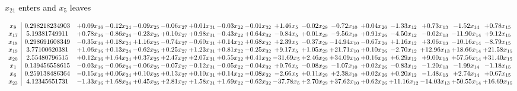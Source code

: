 \documentclass[9pt]{article}
\begin{document}
 $ x_{21} $ enters and $ x_{5} $ leaves 

 \[\begin{array}{c| c c@{\hskip 2pt} c@{\hskip 2pt} c@{\hskip 2pt} c@{\hskip 2pt} c@{\hskip 2pt} c@{\hskip 2pt} c@{\hskip 2pt} c@{\hskip 2pt} c@{\hskip 2pt} c@{\hskip 2pt} c@{\hskip 2pt} c@{\hskip 2pt} c@{\hskip 2pt} c@{\hskip 2pt} c@{\hskip 2pt} }
 x_{8}   &  0.298218234903 & +  0.09 x_{16} & -0.12 x_{24} & -0.09 x_{25} & -0.06 x_{27} & +  0.01 x_{31} & -0.03 x_{22} & -0.01 x_{32} & +  1.46 x_{5} & -0.02 x_{29} & -0.72 x_{10} & +  0.04 x_{26} & -1.33 x_{12} & +  0.73 x_{13} & -1.52 x_{14} & +  0.78 x_{15}\\
 x_{17}   &  5.19381749911 & +  0.78 x_{16} & -0.86 x_{24} & -0.23 x_{25} & +  0.10 x_{27} & +  0.98 x_{31} & -0.43 x_{22} & +  0.64 x_{32} & -0.84 x_{5} & +  0.01 x_{29} & -9.56 x_{10} & +  0.91 x_{26} & -4.50 x_{12} & -0.02 x_{13} & -11.90 x_{14} & +  9.12 x_{15}\\
 x_{18}   &  0.298691608349 & -0.35 x_{16} & +  0.18 x_{24} & +  1.16 x_{25} & -0.74 x_{27} & -0.60 x_{31} & +  0.14 x_{22} & +  0.68 x_{32} & +  2.39 x_{5} & -0.37 x_{29} & -14.94 x_{10} & -0.67 x_{26} & +  1.16 x_{12} & +  3.06 x_{13} & -10.16 x_{14} & -8.79 x_{15}\\
 x_{19}   &  3.77100620381 & +  1.06 x_{16} & +  0.13 x_{24} & -0.62 x_{25} & +  0.25 x_{27} & +  1.23 x_{31} & +  0.81 x_{22} & -0.25 x_{32} & +  9.17 x_{5} & +  1.05 x_{29} & + 21.71 x_{10} & +  0.10 x_{26} & -2.70 x_{12} & + 12.96 x_{13} & + 18.66 x_{14} & + 21.58 x_{15}\\
 x_{20}   &  2.55480796515 & +  0.12 x_{16} & +  1.64 x_{24} & +  0.37 x_{25} & +  2.47 x_{27} & +  2.07 x_{31} & +  0.55 x_{22} & +  0.41 x_{32} & -31.69 x_{5} & +  2.46 x_{29} & + 34.09 x_{10} & +  0.16 x_{26} & +  6.29 x_{12} & +  9.00 x_{13} & + 57.56 x_{14} & + 31.40 x_{15}\\
 x_{1}   &  0.139456558615 & -0.03 x_{16} & -0.06 x_{24} & -0.06 x_{25} & -0.07 x_{27} & -0.12 x_{31} & -0.05 x_{22} & -0.04 x_{32} & +  0.76 x_{5} & -0.08 x_{29} & -1.07 x_{10} & +  0.02 x_{26} & -0.83 x_{12} & -1.20 x_{13} & -1.99 x_{14} & -1.18 x_{15}\\
 x_{6}   &  0.259138486364 & -0.15 x_{16} & +  0.06 x_{24} & +  0.10 x_{25} & +  0.13 x_{27} & +  0.10 x_{31} & +  0.14 x_{22} & -0.08 x_{32} & -2.66 x_{5} & +  0.11 x_{29} & +  2.38 x_{10} & +  0.02 x_{26} & +  0.20 x_{12} & -1.48 x_{13} & +  2.74 x_{14} & +  0.67 x_{15}\\
 x_{23}   &  4.12345651731 & -1.33 x_{16} & +  1.68 x_{24} & +  0.45 x_{25} & +  2.81 x_{27} & +  1.58 x_{31} & +  1.69 x_{22} & -0.62 x_{32} & -37.78 x_{5} & +  2.70 x_{29} & + 37.62 x_{10} & +  0.62 x_{26} & + 11.16 x_{12} & -14.03 x_{13} & + 50.55 x_{14} & + 16.69 x_{15}\\

\end{array}\]
\end{document}
